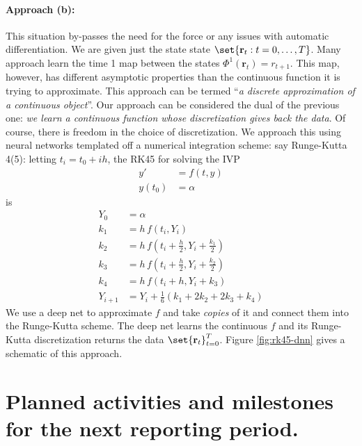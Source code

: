 \documentclass[11pt]{article}
\newcommand{\mbf}{\mathbf} 			%
\theoremstyle{plain}
\theoremstyle{remark}
\theoremstyle{definition}
\begin{document}
\paragraph{Approach (b):}
This situation by-passes the need for the force or any issues with automatic differentiation. We are given just the state state $\set{\mbf r_t : t=0,\dots, T}$. Many approach learn the time 1 map between the states $\Phi^1(\mbf r_t) = r_{t+1}$. This map, however, has different asymptotic properties than the continuous function it is trying to approximate. This approach can be termed ``\emph{a discrete approximation of a continuous object}''. Our approach can be considered the dual of the previous one: \emph{we learn a continuous function whose discretization gives back the data}. Of course, there is freedom in the choice of discretization. We approach this using neural networks templated off a numerical integration scheme: say Runge-Kutta 4(5): letting $t_i = t_0 + i h$, the RK45 for solving the IVP
	\begin{equation}
	\begin{aligned}
	y' &= f(t,y) \\
	y(t_0) &= \alpha
	\end{aligned}
	\end{equation}
 is
	\begin{equation}
	\begin{aligned}
	Y_0 &= \alpha \\
	k_1 &= h\, f(t_i, Y_i) \\
	k_2 &= h\, f(t_i + \frac{h}{2}, Y_i + \frac{k_1}{2}) \\
	k_3 &= h\, f(t_i + \frac{h}{2}, Y_i + \frac{k_2}{2}) \\
	k_4 &= h\, f(t_i + h, Y_i + k_3) \\
	Y_{i+1} &= Y_i + \frac{1}{6}(k_1 + 2k_2 + 2k_3 + k_4)
	\end{aligned}
	\end{equation}
We use a deep net to approximate $f$ and take \emph{copies} of it and connect them into the Runge-Kutta scheme. The deep net learns the continuous $f$ and its Runge-Kutta discretization returns the data $\set{ \mbf r_t }_{t=0}^{T}$. Figure \ref{fig:rk45-dnn} gives a schematic of this approach.




\section{Planned activities and milestones for the next reporting period.}
\end{document}
